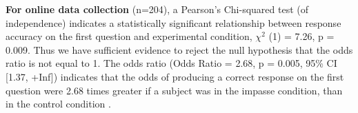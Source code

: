 \documentclass[
  letterpaper,
  DIV=11,
  numbers=noendperiod]{scrreprt}
\newenvironment{Shaded}{\begin{snugshade}}{\end{snugshade}}
\newcommand{\AttributeTok}[1]{\textcolor[rgb]{0.40,0.45,0.13}{#1}}
\newcommand{\ConstantTok}[1]{\textcolor[rgb]{0.56,0.35,0.01}{#1}}
\newcommand{\DecValTok}[1]{\textcolor[rgb]{0.68,0.00,0.00}{#1}}
\newcommand{\FunctionTok}[1]{\textcolor[rgb]{0.28,0.35,0.67}{#1}}
\newcommand{\NormalTok}[1]{\textcolor[rgb]{0.00,0.23,0.31}{#1}}
\newcommand{\OtherTok}[1]{\textcolor[rgb]{0.00,0.23,0.31}{#1}}
\newcommand{\SpecialCharTok}[1]{\textcolor[rgb]{0.37,0.37,0.37}{#1}}
\begin{document}
\textbf{For online data collection} (n=204), a Pearson's Chi-squared
test (of independence) indicates a statistically significant
relationship between response accuracy on the first question and
experimental condition, \(\chi^2\) (1) = 7.26, p = 0.009. Thus we have
sufficient evidence to reject the null hypothesis that the odds ratio is
not equal to 1. The odds ratio (Odds Ratio = 2.68, p = 0.005, 95\% CI
{[}1.37, +Inf{]}) indicates that the odds of producing a correct
response on the first question were 2.68 times greater if a subject was
in the impasse condition, than in the control condition .

\begin{Shaded}
\end{Shaded}
\end{document}
